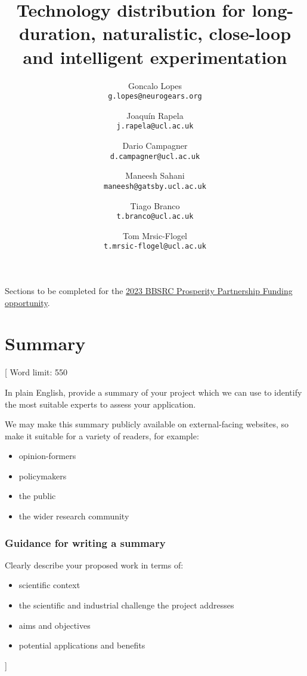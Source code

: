 \documentclass{article}
\title{Technology distribution for long-duration, naturalistic, close-loop
and intelligent experimentation}
\author{
    Goncalo Lopes\\
    \texttt{g.lopes@neurogears.org}\and
    Joaqu\'{i}n Rapela\\
    \texttt{j.rapela@ucl.ac.uk}\and
    Dario Campagner\\
    \texttt{d.campagner@ucl.ac.uk}\and
    Maneesh Sahani\\
    \texttt{maneesh@gatsby.ucl.ac.uk}\and
    Tiago Branco\\
    \texttt{t.branco@ucl.ac.uk}\and
    Tom Mrsic-Flogel\\
    \texttt{t.mrsic-flogel@ucl.ac.uk}
}
\newcommand{\desc}[1]{{\leavevmode\color{blue}[#1]}}
\begin{document}
\maketitle

Sections to be completed for the \href{https://www.ukri.org/opportunity/business-and-academia-prosperity-partnership-round-2/}{2023 BBSRC Prosperity Partnership Funding
opportunity}.

\section{Summary}
\desc{
Word limit: 550

In plain English, provide a summary of your project which we can use to
identify the most suitable experts to assess your application.

We may make this summary publicly available on external-facing websites, so
make it suitable for a variety of readers, for example:

\begin{itemize}
    \item opinion-formers

    \item policymakers

    \item the public

    \item the wider research community
\end{itemize}

\subsubsection*{Guidance for writing a summary}

Clearly describe your proposed work in terms of:

\begin{itemize}
    \item scientific context

    \item the scientific and industrial challenge the project addresses

    \item aims and objectives

    \item potential applications and benefits
\end{itemize}
}


\end{document}
